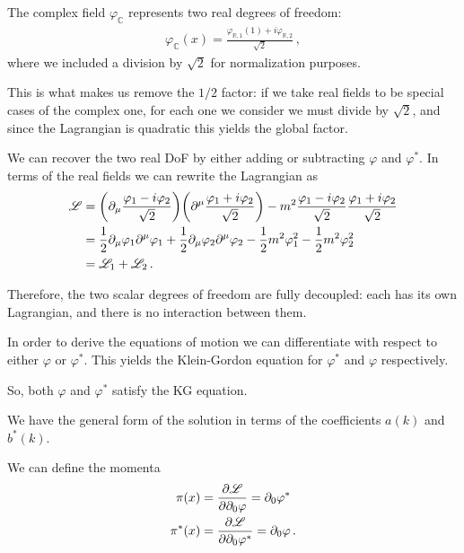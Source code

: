 \documentclass[main.tex]{subfiles}
\begin{document}
The complex field \(\varphi_{\mathbb{C}}\) represents two real degrees of freedom: 
%
\begin{align}
\varphi_{\mathbb{C}} (x) = \frac{\varphi_{\mathbb{R}, 1}(1) + i \varphi_{\mathbb{R}, 2}}{\sqrt{2}}
\,,
\end{align}
%
where we included a division by \(\sqrt{2}\) for normalization purposes.

This is what makes us remove the \(1/2\) factor: if we take real fields to be special cases of the complex one, for each one we consider we must divide by \(\sqrt{2}\), and since the Lagrangian is quadratic this yields the global factor. 

We can recover the two real DoF by either adding or subtracting  \(\varphi \) and \(\varphi^{*}\). 
In terms of the real fields we can rewrite the Lagrangian as 
%
\begin{subequations}
\begin{align}
\mathscr{L} &= \qty(\partial_{\mu } \frac{\varphi_1 -i \varphi_2 }{\sqrt{2}})
\qty(\partial^{\mu } \frac{\varphi_1 +i \varphi_2 }{\sqrt{2}})
- m^2 \frac{\varphi_1 -i \varphi_2 }{\sqrt{2}} \frac{\varphi_1 + i \varphi_2 }{\sqrt{2}}  \\
&= \frac{1}{2} \partial_{\mu } \varphi_1 \partial^{\mu } \varphi_1 
+ \frac{1}{2} \partial_{\mu } \varphi_2 \partial^{\mu } \varphi_2 
- \frac{1}{2} m^2 \varphi_1^2 - \frac{1}{2} m^2 \varphi_2^2  \\
&= \mathscr{L}_{1} + \mathscr{L}_{2}
\,.
\end{align}
\end{subequations}

Therefore, the two scalar degrees of freedom are fully decoupled: each has its own Lagrangian, and there is no interaction between them.

In order to derive the equations of motion we can differentiate with respect to either \(\varphi \) or \(\varphi^{*}\). This yields the Klein-Gordon equation for \(\varphi^{*}\) and \(\varphi \) respectively. 

So, both \(\varphi \) and \(\varphi^{*}\) satisfy the KG equation. 

We have the general form of the solution in terms of the coefficients \(a(k)\) and \(b^{*}(k)\).

We can define the momenta 
%
\begin{subequations}
\begin{align}
\pi (x) &= \pdv{\mathscr{L}}{\partial_0 \varphi} = \partial_{0} \varphi^{*}  \\
\pi^{*} (x) &= \pdv{\mathscr{L}}{\partial_0 \varphi^{*}} = \partial_{0} \varphi  
\,.
\end{align}
\end{subequations}
\end{document}
